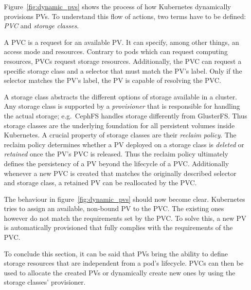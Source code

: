 Figure~\ref{fig:dynamic_pvs} shows the process of how Kubernetes dynamically
provisions \acp{PV}. To understand this flow of actions, two terms have to be
defined: \textit{\acf{PVC}} and \textit{storage classes}. 

A \ac{PVC} is a request for an available \ac{PV}. It can specify, among other
things, an access mode and resources. Contrary to pods which can request
computing resources, \acp{PVC} request storage resources. Additionally, the
\ac{PVC} can request a specific storage class and a selector that must match
the \ac{PV}'s label. Only if the selector matches the \ac{PV}'s label, the
\ac{PV} is capable of resolving the \ac{PVC}.

A storage class abstracts the different options of storage available in a
cluster. Any storage class is supported by a \textit{provisioner} that is
responsible for handling the actual storage; e.g.\ CephFS handles storage
differently from GlusterFS. Thus storage classes are the underlying foundation
for all persistent volumes inside Kubernetes. A crucial property of storage
classes are their \textit{reclaim policy}. The reclaim policy determines
whether a \ac{PV} deployed on a storage class is \textit{deleted} or
\textit{retained} once the \ac{PV}'s \ac{PVC} is released. Thus the reclaim
policy ultimately defines the persistency of a \ac{PV} beyond the lifecycle of
a \ac{PVC}. Additionally whenever a new \ac{PVC} is created that matches the
originally described selector and storage class, a retained \ac{PV} can be
reallocated by the \ac{PVC}.

The behaviour in figure~\ref{fig:dynamic_pvs} should now become clear.
Kubernetes tries to assign an available, non-bound \ac{PV} to the \ac{PVC}.
The existing ones however do not match the requirements set by the \ac{PVC}. To
solve this, a new \ac{PV} is automatically provisioned that fully complies with
the requirements of the \ac{PVC}.

To conclude this section, it can be said that \acp{PV} bring the ability to
define storage resources that are independent from a pod's lifecycle.
\acp{PVC} can then be used to allocate the created \acp{PV} or dynamically
create new ones by using the storage classes' provisioner.

